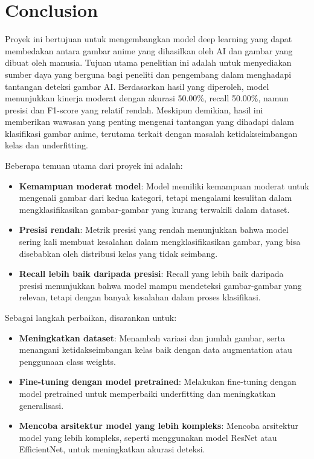 \documentclass[12pt,a4paper]{article}
\begin{document}
\newpage
\section{Conclusion}

Proyek ini bertujuan untuk mengembangkan model deep learning yang dapat membedakan antara gambar anime yang dihasilkan oleh AI dan gambar yang dibuat oleh manusia. Tujuan utama penelitian ini adalah untuk menyediakan sumber daya yang berguna bagi peneliti dan pengembang dalam menghadapi tantangan deteksi gambar AI. Berdasarkan hasil yang diperoleh, model menunjukkan kinerja moderat dengan akurasi 50.00\%, recall 50.00\%, namun presisi dan F1-score yang relatif rendah. Meskipun demikian, hasil ini memberikan wawasan yang penting mengenai tantangan yang dihadapi dalam klasifikasi gambar anime, terutama terkait dengan masalah ketidakseimbangan kelas dan underfitting.

Beberapa temuan utama dari proyek ini adalah:
\begin{itemize}
    \item \textbf{Kemampuan moderat model}: Model memiliki kemampuan moderat untuk mengenali gambar dari kedua kategori, tetapi mengalami kesulitan dalam mengklasifikasikan gambar-gambar yang kurang terwakili dalam dataset.
    \item \textbf{Presisi rendah}: Metrik presisi yang rendah menunjukkan bahwa model sering kali membuat kesalahan dalam mengklasifikasikan gambar, yang bisa disebabkan oleh distribusi kelas yang tidak seimbang.
    \item \textbf{Recall lebih baik daripada presisi}: Recall yang lebih baik daripada presisi menunjukkan bahwa model mampu mendeteksi gambar-gambar yang relevan, tetapi dengan banyak kesalahan dalam proses klasifikasi.
\end{itemize}

Sebagai langkah perbaikan, disarankan untuk:
\begin{itemize}
    \item \textbf{Meningkatkan dataset}: Menambah variasi dan jumlah gambar, serta menangani ketidakseimbangan kelas baik dengan data augmentation atau penggunaan class weights.
    \item \textbf{Fine-tuning dengan model pretrained}: Melakukan fine-tuning dengan model pretrained untuk memperbaiki underfitting dan meningkatkan generalisasi.
    \item \textbf{Mencoba arsitektur model yang lebih kompleks}: Mencoba arsitektur model yang lebih kompleks, seperti menggunakan model ResNet atau EfficientNet, untuk meningkatkan akurasi deteksi.
\end{itemize}
\end{document}
